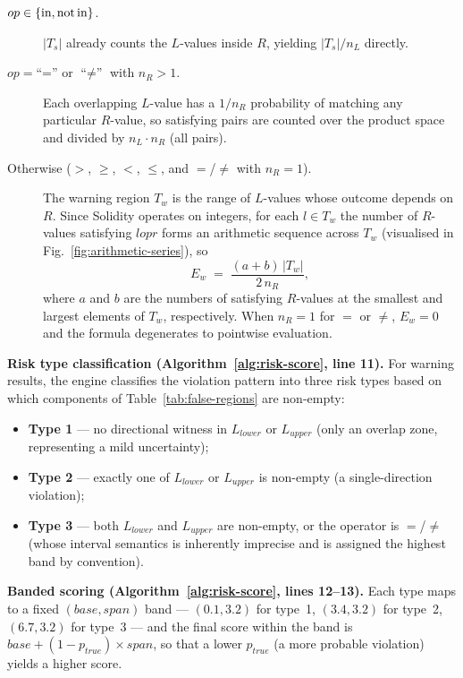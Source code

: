 \documentclass[pdflatex,sn-basic]{sn-jnl}%
\theoremstyle{thmstyleone}%
\theoremstyle{thmstyletwo}%
\theoremstyle{thmstylethree}%
\begin{document}
\begin{description}
\item[$op \in \{\text{in}, \text{not\,in}\}$.] $|T_s|$ already counts the $L$-values inside $R$, yielding $|T_s|/n_L$ directly.
\item[$op = \text{``=''}$ or $\text{``$\neq$''}$ with $n_R > 1$.] Each overlapping $L$-value has a $1/n_R$ probability of matching any particular $R$-value, so satisfying pairs are counted over the product space and divided by $n_L \cdot n_R$ (all pairs).
\item[Otherwise ($>$, $\geq$, $<$, $\leq$, and $=$/$\neq$ with $n_R = 1$).] The warning region $T_w$ is the range of $L$-values whose outcome depends on $R$.
Since Solidity operates on integers, for each $l \in T_w$ the number of $R$-values satisfying $l \mathrel{op} r$ forms an arithmetic sequence across $T_w$ (visualised in Fig.~\ref{fig:arithmetic-series}), so
\[
E_w \;=\; \frac{(a + b) \, |T_w|}{2 \, n_R},
\]
where $a$ and $b$ are the numbers of satisfying $R$-values at the smallest and largest elements of $T_w$, respectively.
When $n_R = 1$ for $=$ or $\neq$, $E_w = 0$ and the formula degenerates to pointwise evaluation.
\end{description}

\smallskip
\textbf{Risk type classification (Algorithm~\ref{alg:risk-score}, line 11).}
For warning results, the engine classifies the violation pattern into three risk types based on which components of Table~\ref{tab:false-regions} are non-empty:
\begin{itemize}
    \item \textbf{Type 1} --- no directional witness in $L_{\mathit{lower}}$ or $L_{\mathit{upper}}$ (only an overlap zone, representing a mild uncertainty);
    \item \textbf{Type 2} --- exactly one of $L_{\mathit{lower}}$ or $L_{\mathit{upper}}$ is non-empty (a single-direction violation);
    \item \textbf{Type 3} --- both $L_{\mathit{lower}}$ and $L_{\mathit{upper}}$ are non-empty, or the operator is $=$/$\neq$ (whose interval semantics is inherently imprecise and is assigned the highest band by convention).
\end{itemize}

\smallskip
\textbf{Banded scoring (Algorithm~\ref{alg:risk-score}, lines 12--13).}
Each type maps to a fixed $(\mathit{base}, \mathit{span})$ band --- $(0.1, 3.2)$ for type~1, $(3.4, 3.2)$ for type~2, $(6.7, 3.2)$ for type~3 --- and the final score within the band is $\mathit{base} + (1 - p_{\mathit{true}}) \times \mathit{span}$, so that a lower $p_{\mathit{true}}$ (a more probable violation) yields a higher score.
\end{document}
